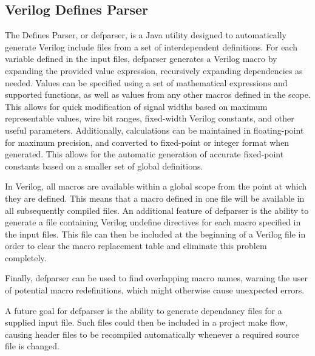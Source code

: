 \documentclass[12pt]{article}
\begin{document}
\subsection{Verilog Defines Parser}
The Defines Parser, or defparser, is a Java utility designed to automatically generate Verilog include files from a set of interdependent definitions. For each variable defined in the input files, defparser generates a Verilog macro by expanding the provided value expression, recursively expanding dependencies as needed. Values can be specified using a set of mathematical expressions and supported functions, as well as values from any other macros defined in the scope. This allows for quick modification of signal widths based on maximum representable values, wire bit ranges, fixed-width Verilog constants, and other useful parameters. Additionally, calculations can be maintained in floating-point for maximum precision, and converted to fixed-point or integer format when generated. This allows for the automatic generation of accurate fixed-point constants based on a smaller set of global definitions.

In Verilog, all macros are available within a global scope from the point at which they are defined. This means that a macro defined in one file will be available in all subsequently compiled files. An additional feature of defparser is the ability to generate a file containing Verilog undefine directives for each macro specified in the input files. This file can then be included at the beginning of a Verilog file in order to clear the macro replacement table and eliminate this problem completely.

Finally, defparser can be used to find overlapping macro names, warning the user of potential macro redefinitions, which might otherwise cause unexpected errors.

A future goal for defparser is the ability to generate dependancy files for a supplied input file. Such files could then be included in a project make flow, causing header files to be recompiled automatically whenever a required source file is changed.
\end{document}
